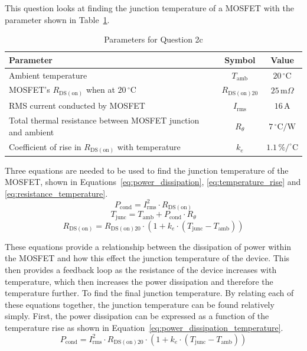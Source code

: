 \documentclass[a4paper, 12pt, titlepage]{report}
\begin{document}
This question looks at finding the junction temperature of a MOSFET with the parameter shown in Table~\ref{tab:question2c}.
\begin{table}[htbp]
    \centering
    \caption{Parameters for Question 2c}
    \label{tab:question2c}
    \begin{tabular}{|l|c|c|}
        \hline
        \textbf{Parameter} & \textbf{Symbol} & \textbf{Value} \\
        \hline
        Ambient temperature & \(T_{\mathrm{amb}}\) & \(20\,^\circ\mathrm{C}\) \\
        MOSFET's \(R_{\mathrm{DS(on)}}\) when at \(20\,^\circ\mathrm{C}\) & \(R_{\mathrm{DS(on)20}}\) & \(25\,\mathrm{m}\Omega\) \\
        RMS current conducted by MOSFET & \(I_{\mathrm{rms}}\) & \(16\,\mathrm{A}\) \\
        Total thermal resistance between MOSFET junction and ambient & \(R_\theta\) & \(7\,^\circ\mathrm{C/W}\) \\
        Coefficient of rise in \(R_{\mathrm{DS(on)}}\) with temperature & \(k_e\) & \(1.1\,\%/^\circ\mathrm{C}\) \\
        \hline
    \end{tabular}
\end{table}

Three equations are needed to be used to find the junction temperature of the MOSFET, shown in Equations~\ref{eq:power_dissipation}, \ref{eq:temperature_rise} and \ref{eq:resistance_temperature}.
\begin{equation}
    P_{\mathrm{cond}} = I_{\mathrm{rms}}^2 \cdot R_{\mathrm{DS(on)}}
    \label{eq:power_dissipation}
\end{equation}
\begin{equation}
    T_{\mathrm{junc}} = T_{\mathrm{amb}} + P_{\mathrm{cond}} \cdot R_\theta
    \label{eq:temperature_rise}
\end{equation}
\begin{equation}
    R_{\mathrm{DS(on)}} = R_{\mathrm{DS(on)20}} \cdot (1 + k_e \cdot (T_{\mathrm{junc}} - T_{\mathrm{amb}}))
    \label{eq:resistance_temperature}
\end{equation}

These equations provide a relationship between the dissipation of power within the MOSFET and how this effect the junction temperature of the device. This then provides a feedback loop as the resistance of the device increases with temperature, which then increases the power dissipation and therefore the temperature further. To find the final junction temperature. By relating each of these equations together, the junction temperature can be found relatively simply. First, the power dissipation can be expressed as a function of the temperature rise as shown in Equation~\ref{eq:power_dissipation_temperature}.
\begin{equation}
    P_{\mathrm{cond}} = I_{\mathrm{rms}}^2 \cdot R_{\mathrm{DS(on)20}} \cdot (1 + k_e \cdot (T_{\mathrm{junc}} - T_{\mathrm{amb}}))
    \label{eq:power_dissipation_temperature}
\end{equation}
\end{document}
